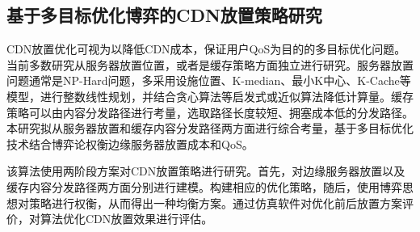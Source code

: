


\subsection{基于多目标优化博弈的CDN放置策略研究}
CDN放置优化可视为以降低CDN成本，保证用户QoS为目的的多目标优化问题。当前多数研究从服务器放置位置，或者是缓存策略方面独立进行研究。服务器放置问题通常是NP-Hard问题，多采用设施位置、K-median、最小K中心、K-Cache等模型，进行整数线性规划，并结合贪心算法等启发式或近似算法降低计算量。缓存策略可以由内容分发路径进行考量，选取路径长度较短、拥塞成本低的分发路径。本研究拟从服务器放置和缓存内容分发路径两方面进行综合考量，基于多目标优化技术结合博弈论权衡边缘服务器放置成本和QoS。

该算法使用两阶段方案对CDN放置策略进行研究。首先，对边缘服务器放置以及缓存内容分发路径两方面分别进行建模。构建相应的优化策略，随后，使用博弈思想对策略进行权衡，从而得出一种均衡方案。通过仿真软件对优化前后放置方案评价，对算法优化CDN放置效果进行评估。

 
